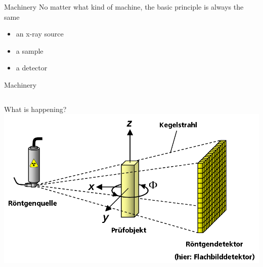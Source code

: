 \begin{frame}{Machinery}
	No matter what kind of machine, the basic principle is always the same
	\begin{itemize}
		\item an x-ray source
		\item a sample
		\item a detector
	\end{itemize}
\end{frame}

\begin{frame}{Machinery}
	\begin{columns}
		\begin{column}{0.49\linewidth}
			\centering
			
		\end{column}
		\begin{column}{0.49\linewidth}
			\centering
			
		\end{column}
	\end{columns}
\end{frame}

\begin{frame}{What is happening?}
	\centering
	\includegraphics[height=0.618\textheight]{./images/3D_Computed_Tomography}
\end{frame}

